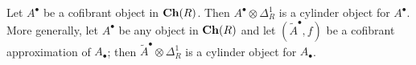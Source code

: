 \begin{refsection}

\begin{lemma}
Let $A^\bullet$ be a cofibrant object in $\mathbf{Ch}(R)$. Then $A^\bullet \otimes \Delta^1_R$ is a cylinder object for $A^\bullet$. More generally, let $A^\bullet$ be any object in $\mathbf{Ch}(R)$ and let $(\widetilde{A}^\bullet,f)$ be a cofibrant approximation of $A_\bullet$; then $\widetilde{A}^\bullet \otimes \Delta^1_R$ is a cylinder object for $A_\bullet$.
\end{lemma}


\end{refsection}
